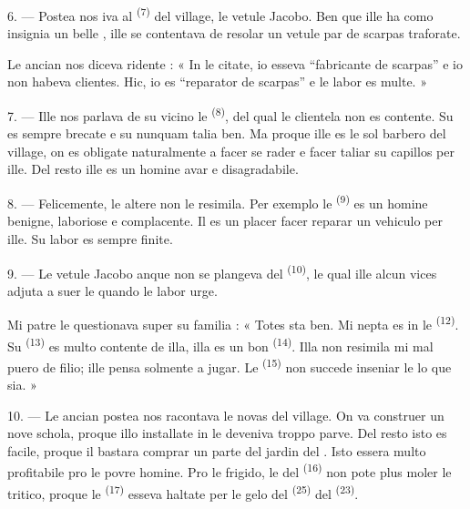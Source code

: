 6. --- Postea nos iva al  \textsuperscript{(7)} del village, le
vetule Jacobo. Ben que ille ha como insignia un belle , ille se
contentava de resolar un vetule par de scarpas traforate.

Le ancian nos diceva ridente : « In le citate, io esseva “fabricante de
scarpas” e io non habeva clientes. Hic, io es “reparator de scarpas” e le labor
es multe. »

7. --- Ille nos parlava de su vicino le  \textsuperscript{(8)},
del qual le clientela non es contente. Su  es sempre brecate e
su  nunquam talia ben. Ma proque ille es le sol barbero del
village, on es obligate naturalmente a facer se rader e facer taliar su capillos
per ille. Del resto ille es un homine avar e disagradabile.

8. --- Felicemente, le altere  non le resimila. Per exemplo le
 \textsuperscript{(9)} es un homine benigne, laboriose e
complacente. Il es un placer facer reparar un vehiculo per ille. Su labor es
sempre finite.

9. --- Le vetule Jacobo anque non se plangeva del 
\textsuperscript{(10)}, le qual ille alcun vices adjuta a suer le
 quando le labor urge.

Mi patre le questionava super su familia : « Totes sta ben. Mi nepta es in le
 \textsuperscript{(12)}. Su 
\textsuperscript{(13)} es multo contente de illa, illa es un bon 
\textsuperscript{(14)}. Illa non resimila mi mal puero de filio; ille pensa
solmente a jugar. Le  \textsuperscript{(15)} non succede
inseniar le lo que sia. »

\VUsaut{3.0mm}
\VUsaut{3.0mm}

10. --- Le ancian postea nos racontava le novas del village. On va construer un
nove schola, proque illo installate in le  deveniva troppo
parve. Del resto isto es facile, proque il bastara comprar un parte del jardin
del . Isto essera multo profitabile pro le povre homine. Pro le
frigido, le  del  \textsuperscript{(16)} non pote
plus moler le tritico, proque le  \textsuperscript{(17)} esseva
haltate per le gelo del  \textsuperscript{(25)} del
 \textsuperscript{(23)}.

